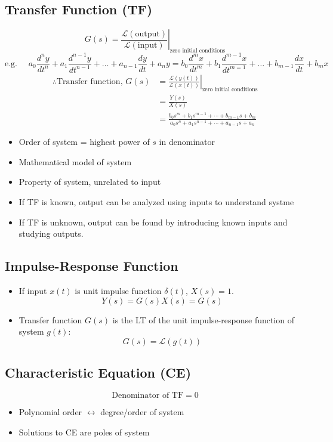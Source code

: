 \documentclass[a4paper]{article}
\begin{document}
\subsection{Transfer Function (TF)}
$$G(s) = \left.\frac{\mathscr{L}(\text{output})}{\mathscr{L}(\text{input})}\right|_\text{zero initial conditions}$$
$$\text{e.g. }\quad a_0\frac{d^ny}{dt^n}+a_1\frac{d^{n-1}y}{dt^{n-1}}+\ldots+a_{n-1}\frac{dy}{dt}+a_ny = b_0\frac{d^mx}{dt^m}+b_1\frac{d^{m-1}x}{dt^{m=1}}+\ldots+b_{m-1}\frac{dx}{dt}+b_mx$$
\begin{align*}
    \therefore \text{Transfer function, }G(s) &= \left.\frac{\mathscr{L}(y(t))}{\mathscr{L}(x(t))}\right|_\text{zero initial conditions}\\
    &= \frac{Y(s)}{X(s)}\\
    &= \frac{b_0s^m+b_1s^{m-1}+\cdots+b_{m-1}s+b_m}{a_0s^n+a_1s^{n-1}+\cdots+a_{n-1}s+a_n}
\end{align*}
\begin{itemize}
    \item Order of system = highest power of $s$ in denominator
    \item Mathematical model of system
    \item Property of system, unrelated to input
    \item If TF is known, output can be analyzed using inputs to understand systme
    \item If TF is unknown, output can be found by introducing known inputs and studying outputs.
\end{itemize}

\subsection{Impulse-Response Function}
\begin{itemize}
    \item If input $x(t)$ is unit impulse function $\delta(t)$, $X(s) = 1$.
    $$Y(s) = G(s)X(s) = G(s)$$
    \item Transfer function $G(s)$ is the LT of the unit impulse-response function of system $g(t)$:
    $$G(s) = \mathscr{L}(g(t))$$
\end{itemize}

\subsection{Characteristic Equation (CE)}
$$\text{Denominator of TF} = 0$$
\begin{itemize}
    \item Polynomial order $\leftrightarrow$ degree/order of system
    \item Solutions to CE are poles of system
\end{itemize}
\end{document}
